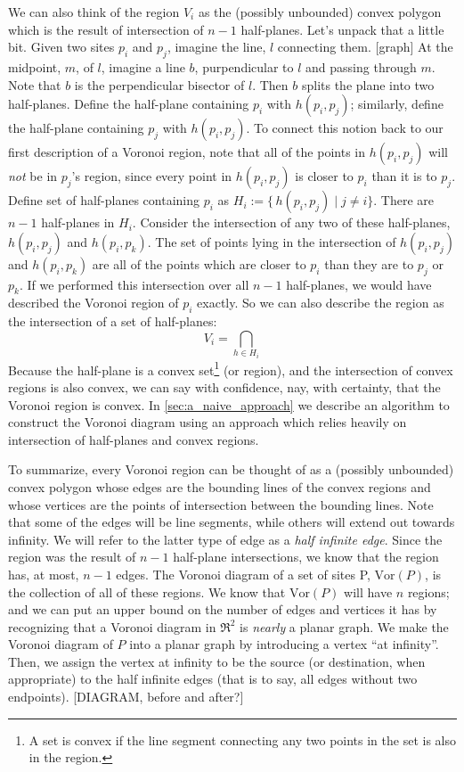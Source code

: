 \documentclass[12pt,twoside]{reedthesis}
\begin{document}
  We can also think of the region $V_{i}$ as the (possibly unbounded) convex polygon which is the result of intersection of $n-1$ half-planes. Let's unpack that a little bit. Given two sites $p_{i}$ and $p_{j}$, imagine the line, $l$ connecting them. [graph] At the midpoint, $m$, of $l$, imagine a line $b$, purpendicular to $l$ and passing through $m$. Note that $b$ is the perpendicular bisector of $l$. Then $b$ splits the plane into two half-planes. Define the half-plane containing $p_{i}$ with $h(p_{i}, p_{j})$; similarly, define the half-plane containing $p_{j}$ with $h(p_{i}, p_{j})$. To connect this notion back to our first description of a Voronoi region, note that all of the points in $h(p_{i}, p_{j})$ will \emph{not} be in $p_{j}$'s region, since every point in $h(p_{i}, p_{j})$ is closer to $p_{i}$ than it is to $p_{j}$. Define set of half-planes containing $p_{i}$ as $H_{i} := \{\,h(p_{i}, p_{j}) \mid j\neq i \}$. There are $n-1$ half-planes in $H_{i}$. Consider the intersection of any two of these half-planes, $h(p_{i}, p_{j})$ and $h(p_{i}, p_{k})$. The set of points lying in the intersection of $h(p_{i}, p_{j})$ and $h(p_{i}, p_{k})$ are all of the points which are closer to $p_{i}$ than they are to $p_{j}$ or $p_{k}$. If we performed this intersection over all $n-1$ half-planes, we would have described the Voronoi region of $p_{i}$ exactly. So we can also describe the region as the intersection of a set of half-planes:
  $$V_{i} = \bigcap_{h \in H_{i}}$$ 
  Because the half-plane is a convex set\footnote{A set is convex if the line segment connecting any two points in the set is also in the region.} (or region), and the intersection of convex regions is also convex, we can say with confidence, nay, with certainty, that the Voronoi region is convex. In \cref{sec:a_naive_approach} we describe an algorithm to construct the Voronoi diagram using an approach which relies heavily on intersection of half-planes and convex regions.\par
  To summarize, every Voronoi region can be thought of as a (possibly unbounded) convex polygon whose edges are the bounding lines of the convex regions and whose vertices are the points of intersection between the bounding lines. Note that some of the edges will be line segments, while others will extend out towards infinity. We will refer to the latter type of edge as a \emph{half infinite edge}. Since the region was the result of $n-1$ half-plane intersections, we know that the region has, at most, $n-1$ edges. The Voronoi diagram of a set of sites P, $\mbox{Vor}(P)$, is the collection of all of these regions.
  We know that $\mbox{Vor}(P)$ will have $n$ regions; and we can put an upper bound on the number of edges and vertices it has by recognizing that a Voronoi diagram in $\Re^2$ is \emph{nearly} a planar graph. We make the Voronoi diagram of $P$ into a planar graph by introducing a vertex ``at infinity''. Then, we assign the vertex at infinity to be the source (or destination, when appropriate) to the half infinite edges (that is to say, all edges without two endpoints). [DIAGRAM, before and after?] \par
\end{document}

